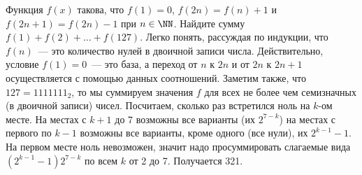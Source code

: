 \problem
Функция $f(x)$ такова, что
$f(1) = 0$, $f(2 n) = f(n) + 1$ и $f(2 n + 1) = f(2 n) - 1$ при $n \in \NN$.
Найдите сумму $f(1) + f(2) + \ldots + f(127)$.
\solution
Легко понять, рассуждая по индукции, что $f(n)$~--- это количество нулей в
двоичной записи числа.
Действительно, условие $f(1) = 0$~--- это база, а переход от $n$ к $2 n$ и
от $2 n$ к $2 n + 1$ осуществляется с помощью данных соотношений.
Заметим также, что $127 = 1111111_2$, то мы суммируем значения $f$ для всех
не более чем семизначных (в двоичной записи) чисел.
Посчитаем, сколько раз встретился ноль на $k$-ом месте.
На местах с $k + 1$ до 7 возможны все варианты (их $2^{7 - k}$) на местах с
первого по $k - 1$ возможны все варианты, кроме одного (все нули), их
$2^{k - 1} - 1$.
На первом месте ноль невозможен, значит надо просуммировать слагаемые вида
$(2^{k - 1} - 1) 2^{7 - k}$ по всем $k$ от 2 до 7.
Получается 321.
\endproblem
